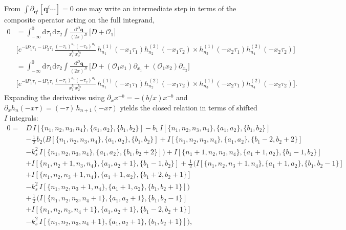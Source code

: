 \documentclass[a4paper]{article}
\newcommand{\FR}[2]{\displaystyle\frac{\,{#1}\,}{#2}}
\def\di{{\mathrm{d}}}
\def\pd{\partial}
\def\ii{\mathrm{i}}
\begin{document}
From $\int \pd_{\bm q^i}[\bm q^i \cdots ]=0$ one may write an intermediate step in terms of the composite operator acting on the full integrand,
\begin{align}
	0 &= \int_{-\infty}^0 \di\tau_1\di\tau_2\int \FR{\di^D \bm q}{(2\pi)^D}\,
	\Big[D+\mathcal{O}_1\Big] \nonumber\\ 
	& \Bigg[
	e^{-\ii P_1\tau_1-\ii P_2\tau_2}
	\frac{(-\tau_1)^{a_1}(-\tau_2)^{a_2}}{x_1^{b_1}x_2^{b_2}}\,
	h_{n_1}^{(1)}(-x_1\tau_1)h_{n_2}^{(2)}(-x_1\tau_2) \times h_{n_3}^{(1)}(-x_2\tau_1)h_{n_4}^{(2)}(-x_2\tau_2)\Bigg] \nonumber\\
	& =  \int_{-\infty}^0 \di\tau_1\di\tau_2\int \FR{\di^D \bm q}{(2\pi)^D}\,
	\Bigg[D+(\mathcal{O}_1 x_1)\partial_{x_1} +(\mathcal{O}_1 x_2)\partial_{x_2}\Bigg] \nonumber\\
	&\Bigg[
	e^{-\ii P_1\tau_1-\ii P_2\tau_2}
	\frac{(-\tau_1)^{a_1}(-\tau_2)^{a_2}}{x_1^{b_1}x_2^{b_2}}\,
	h_{n_1}^{(1)}(-x_1\tau_1)h_{n_2}^{(2)}(-x_1\tau_2)
	  \times h_{n_3}^{(1)}(-x_2\tau_1)h_{n_4}^{(2)}(-x_2\tau_2)\Bigg]. \label{eq:momIBP_qdot_chainrule}
\end{align}
Expanding the derivatives using $\partial_x x^{-b}=-(b/x)x^{-b}$ and $\partial_x h_n(-x\tau)=(-\tau)\,h_{n+1}(-x\tau)$ yields the closed relation in terms of shifted $I$ integrals:
\begin{align}
	0 =& D\,I[\{n_1,n_2,n_3,n_4\},\{a_1,a_2\},\{b_1,b_2\}] - b_1\,I[\{n_1,n_2,n_3,n_4\},\{a_1,a_2\},\{b_1,b_2\}] \nonumber \\
	&- \FR12 b_2\Big(
	B[\{n_1,n_2,n_3,n_4\},\{a_1,a_2\},\{b_1,b_2\}]  + I[\{n_1,n_2,n_3,n_4\},\{a_1,a_2\},\{b_1-2,b_2+2\}] \nonumber\\
	&-k_s^2\,I[\{n_1,n_2,n_3,n_4\},\{a_1,a_2\},\{b_1,b_2+2\}]
	\Big) +I[\{n_1+1,n_2,n_3,n_4\},\{a_1+1,a_2\},\{b_1-1,b_2\}] \nonumber\\
	&+ I[\{n_1,n_2+1,n_3,n_4\},\{a_1,a_2+1\},\{b_1-1,b_2\}] +\FR12 \Big(
	I[\{n_1,n_2,n_3+1,n_4\},\{a_1+1,a_2\},\{b_1,b_2-1\}] \nonumber\\
	&+ I[\{n_1,n_2,n_3+1,n_4\},\{a_1+1,a_2\},\{b_1+2,b_2+1\}]\nonumber\\
    &-k_s^2\,I[\{n_1,n_2,n_3+1,n_4\},\{a_1+1,a_2\},\{b_1,b_2+1\}]
	\Big) \nonumber \\
	&+\FR12\Big(
	I[\{n_1,n_2,n_3,n_4+1\},\{a_1,a_2+1\},\{b_1,b_2-1\}]\nonumber\\
	&+ I[\{n_1,n_2,n_3,n_4+1\},\{a_1,a_2+1\},\{b_1-2,b_2+1\}] \nonumber\\
	&-k_s^2\,I[\{n_1,n_2,n_3,n_4+1\},\{a_1,a_2+1\},\{b_1,b_2+1\}]
	\Big), \label{eq:momIBP_qdot}
\end{align}
\end{document}
